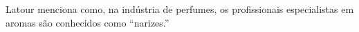 Latour menciona como, na indústria de perfumes, os profissionais especialistas em aromas são conhecidos como \enquote{narizes.}